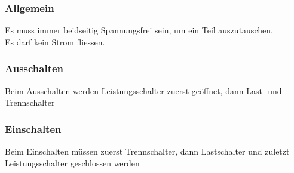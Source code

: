 \subsubsection{Allgemein}
Es muss immer beidseitig Spannungsfrei sein, um ein Teil auszutauschen.\\
Es darf kein Strom fliessen.

\subsubsection{Ausschalten}
Beim Ausschalten werden Leistungsschalter zuerst geöffnet, dann Last- und Trennschalter
\subsubsection{Einschalten}
Beim Einschalten müssen zuerst Trennschalter, dann Lastschalter und zuletzt Leistungsschalter geschlossen werden






